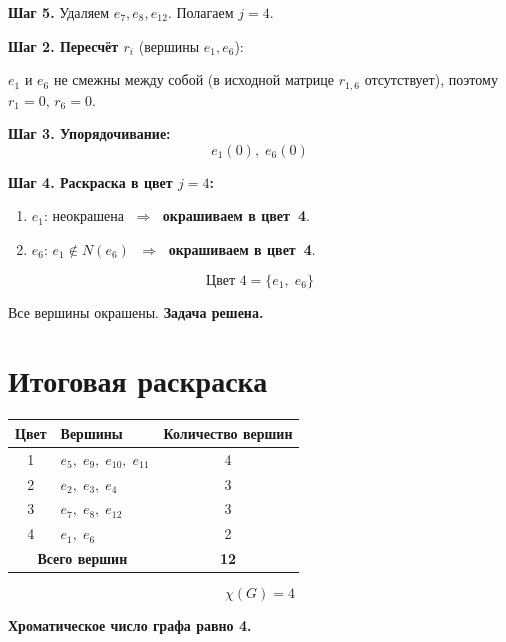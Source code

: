 \documentclass[a4paper,12pt]{article}
\begin{document}
\textbf{Шаг 5.} Удаляем $e_7, e_8, e_{12}$. Полагаем $j = 4$.

\textbf{Шаг 2. Пересчёт $r_i$} (вершины $e_1, e_6$):

$e_1$ и $e_6$ не смежны между собой (в исходной матрице $r_{1,6}$ отсутствует),
поэтому $r_1 = 0$, $r_6 = 0$.

\textbf{Шаг 3. Упорядочивание:}
\[
	e_1(0),\; e_6(0)
\]

\textbf{Шаг 4. Раскраска в цвет $j = 4$:}

\begin{enumerate}
	\item $e_1$: неокрашена $\;\Rightarrow\;$ \textbf{окрашиваем в цвет~4}.
	\item $e_6$: $e_1 \notin N(e_6)$ $\;\Rightarrow\;$ \textbf{окрашиваем в цвет~4}.
\end{enumerate}

\[
	\boxed{\text{Цвет~4} = \{e_1,\; e_6\}}
\]

Все вершины окрашены. \textbf{Задача решена.}

\section*{Итоговая раскраска}

\begin{center}
	\renewcommand{\arraystretch}{1.3}
	\begin{tabular}{|c|l|c|}
		\hline
		\textbf{Цвет}                               & \textbf{Вершины}                 & \textbf{Количество вершин} \\
		\hline
		1                                           & $e_5,\; e_9,\; e_{10},\; e_{11}$ & 4                          \\
		2                                           & $e_2,\; e_3,\; e_4$              & 3                          \\
		3                                           & $e_7,\; e_8,\; e_{12}$           & 3                          \\
		4                                           & $e_1,\; e_6$                     & 2                          \\
		\hline
		\multicolumn{2}{|c|}{\textbf{Всего вершин}} & \textbf{12}                                                   \\
		\hline
	\end{tabular}
\end{center}

\[
	\boxed{\chi(G) = 4}
\]

\textbf{Хроматическое число графа равно 4.}
\end{document}
